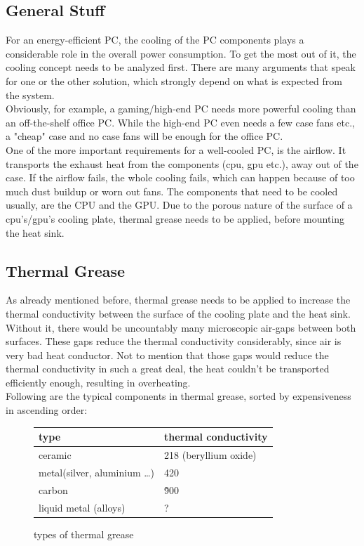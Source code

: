 \subsection{General Stuff}

For an energy-efficient PC, the cooling of the PC components plays a considerable role in the overall power consumption.
To get the most out of it, the cooling concept needs to be analyzed first. There are many arguments that speak for one or the 
other solution, which strongly depend on what is expected from the system.\\
Obviously, for example, a gaming/high-end PC needs more powerful cooling than an off-the-shelf office PC. While the high-end PC even needs
 a few case fans etc., a "cheap" case and no case fans will be enough for the office PC. \\
One of the more important requirements for a well-cooled PC, is the airflow. It transports the exhaust heat from the components (cpu, gpu etc.), away 
out of the case. If the airflow fails, the whole cooling fails, which can happen because of too much dust buildup or worn out fans. 
The components that need to be cooled usually, are the CPU and the GPU. Due to the porous nature of the surface of a cpu's/gpu's cooling plate, thermal
 grease needs to be applied, before mounting the heat sink.

\subsection{Thermal Grease}

As already mentioned before, thermal grease needs to be applied to increase the thermal conductivity between the surface of the cooling plate and the heat sink.
Without it, there would be uncountably many microscopic air-gaps between both surfaces. These gaps reduce the thermal conductivity considerably, since air is 
very bad heat conductor. Not to mention that those gaps would reduce the thermal conductivity in such a great deal, the heat couldn't be transported efficiently enough, resulting in 
overheating. \\
Following are the typical components in thermal grease, sorted by expensiveness in ascending order:

\begin{figure}[H]
  \centering
  \begin{tabular}{|l|l|}
    \hline
    type & thermal conductivity \\\hline\hline
    ceramic & 218 (beryllium oxide) \\\hline
    metal(silver, aluminium \dots) &  420 \\\hline
    carbon & \~900 \\\hline
    liquid metal (alloys) & ? \\\hline
  \end{tabular}
  \caption{types of thermal grease}
\end{figure}


